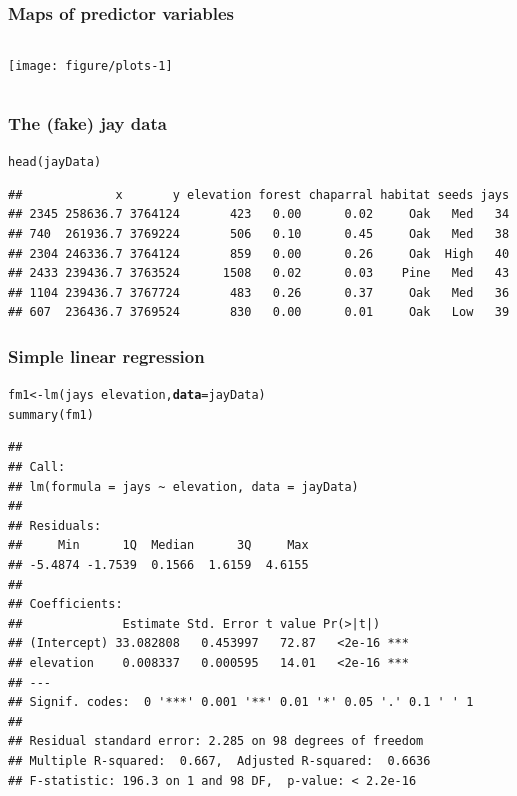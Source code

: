 \documentclass[color=usenames,dvipsnames]{beamer}\usepackage[]{graphicx}\usepackage[]{color}
\makeatletter
\newcommand{\hlopt}[1]{\textcolor[rgb]{0,0,0}{#1}}%
\newcommand{\hlstd}[1]{\textcolor[rgb]{0,0,0}{#1}}%
\newcommand{\hlkwb}[1]{\textcolor[rgb]{0,0.341,0.682}{#1}}%
\newcommand{\hlkwc}[1]{\textcolor[rgb]{0,0,0}{\textbf{#1}}}%
\newcommand{\hlkwd}[1]{\textcolor[rgb]{0.004,0.004,0.506}{#1}}%
\newenvironment{kframe}{%
 \def\at@end@of@kframe{}%
 \ifinner\ifhmode%
  \def\at@end@of@kframe{\end{minipage}}%
  \begin{minipage}{\columnwidth}%
 \fi\fi%
 \def\FrameCommand##1{\hskip\@totalleftmargin \hskip-\fboxsep
 \colorbox{shadecolor}{##1}\hskip-\fboxsep
     \hskip-\linewidth \hskip-\@totalleftmargin \hskip\columnwidth}%
 \MakeFramed {\advance\hsize-\width
   \@totalleftmargin\z@ \linewidth\hsize
   \@setminipage}}%
 {\par\unskip\endMakeFramed%
 \at@end@of@kframe}
\newenvironment{knitrout}{}{} %
\makeatother
\begin{document}
\begin{frame}[fragile]
  \frametitle{Maps of predictor variables}

\begin{columns}
  \column{\dimexpr\paperwidth-10pt}
  \texttt{[image: figure/plots-1]}
\end{columns}
\end{frame}




\begin{frame}[fragile]
  \frametitle{The (fake) jay data}
\begin{knitrout}\scriptsize
{}\color{fgcolor}\begin{kframe}
\begin{alltt}
\hlkwd{head}\hlstd{(jayData)}
\end{alltt}
\begin{verbatim}
##             x       y elevation forest chaparral habitat seeds jays
## 2345 258636.7 3764124       423   0.00      0.02     Oak   Med   34
## 740  261936.7 3769224       506   0.10      0.45     Oak   Med   38
## 2304 246336.7 3764124       859   0.00      0.26     Oak  High   40
## 2433 239436.7 3763524      1508   0.02      0.03    Pine   Med   43
## 1104 239436.7 3767724       483   0.26      0.37     Oak   Med   36
## 607  236436.7 3769524       830   0.00      0.01     Oak   Low   39
\end{verbatim}
\end{kframe}
\end{knitrout}
\end{frame}




\begin{frame}[fragile]
  \frametitle{Simple linear regression}
\begin{knitrout}\scriptsize
{}\color{fgcolor}\begin{kframe}
\begin{alltt}
\hlstd{fm1} \hlkwb{<-} \hlkwd{lm}\hlstd{(jays} \hlopt{~} \hlstd{elevation,} \hlkwc{data}\hlstd{=jayData)}
\hlkwd{summary}\hlstd{(fm1)}
\end{alltt}
\begin{verbatim}
## 
## Call:
## lm(formula = jays ~ elevation, data = jayData)
## 
## Residuals:
##     Min      1Q  Median      3Q     Max 
## -5.4874 -1.7539  0.1566  1.6159  4.6155 
## 
## Coefficients:
##              Estimate Std. Error t value Pr(>|t|)    
## (Intercept) 33.082808   0.453997   72.87   <2e-16 ***
## elevation    0.008337   0.000595   14.01   <2e-16 ***
## ---
## Signif. codes:  0 '***' 0.001 '**' 0.01 '*' 0.05 '.' 0.1 ' ' 1
## 
## Residual standard error: 2.285 on 98 degrees of freedom
## Multiple R-squared:  0.667,	Adjusted R-squared:  0.6636 
## F-statistic: 196.3 on 1 and 98 DF,  p-value: < 2.2e-16
\end{verbatim}
\end{kframe}
\end{knitrout}
\end{frame}
\end{document}
